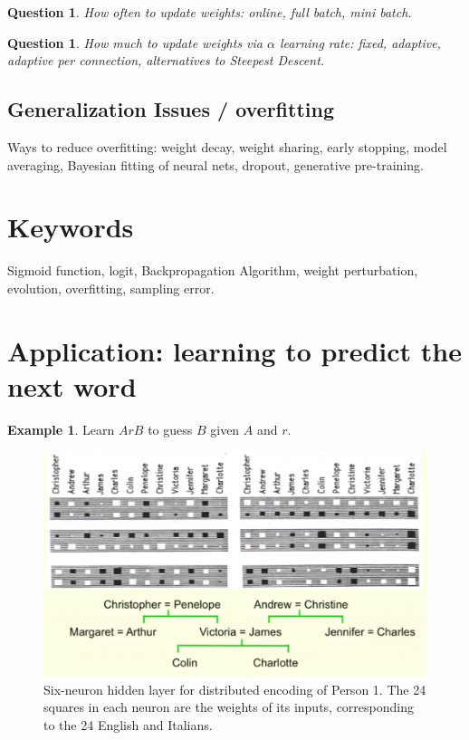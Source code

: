 \documentclass[12pt]{article}
\theoremstyle{plain}
\newtheorem{question}[theorem]{Question}
\theoremstyle{definition}
\newtheorem{example}[theorem]{Example}
\theoremstyle{remark}
\begin{document}
\begin{question}
How often to update weights: online, full batch, mini batch.
\end{question}

\begin{question}
How much to update weights via $\alpha$ learning rate: fixed, adaptive, adaptive per connection, alternatives to Steepest Descent.
\end{question}

\subsection{Generalization Issues / overfitting}

Ways to reduce overfitting: weight decay, weight sharing, early stopping, model averaging, Bayesian fitting of neural nets, dropout, generative pre-training.

\section*{Keywords}

Sigmoid function, logit, Backpropagation Algorithm, weight perturbation, evolution, overfitting, sampling error.

\section{Application: learning to predict the next word}

\begin{example}
Learn $ArB$ to guess $B$ given $A$ and $r$.
\end{example}

\begin{figure}[H]
\centering
\includegraphics[width=1.0\textwidth]{familytree}
\caption{Six-neuron hidden layer for distributed encoding of Person 1. The 24 squares in each neuron are the weights of its inputs, corresponding to the 24 English and Italians.}
\end{figure}
\end{document}
